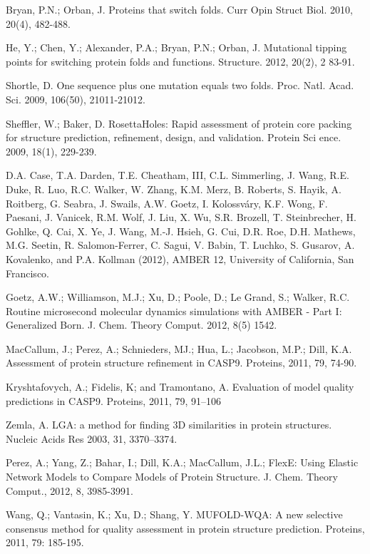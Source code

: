 \documentclass[12pt]{article}
\begin{document}
\begin{thebibliography}{99}
Bryan, P.N.; Orban, J. Proteins that switch folds. Curr Opin Struct Biol. 2010, 20(4), 482-488.

He, Y.; Chen, Y.; Alexander, P.A.; Bryan, P.N.; Orban, J. Mutational tipping points for switching protein folds and functions. Structure. 2012, 20(2), 2
83-91.

Shortle, D. One sequence plus one mutation equals two folds. Proc. Natl. Acad. Sci. 2009, 106(50), 21011-21012.

Sheffler, W.; Baker, D. RosettaHoles: Rapid assessment of protein core packing for structure prediction, refinement, design, and validation. Protein Sci
ence. 2009, 18(1), 229-239.

D.A. Case, T.A. Darden, T.E. Cheatham, III, C.L. Simmerling, J. Wang, R.E. Duke, R. Luo, R.C. Walker, W. Zhang, K.M. Merz, B. Roberts, S. Hayik, A. Roitberg, G. Seabra, J. Swails, A.W. Goetz, I. Kolossváry, K.F. Wong, F. Paesani, J. Vanicek, R.M. Wolf, J. Liu, X. Wu, S.R. Brozell, T. Steinbrecher, H. Gohlke, Q. Cai, X. Ye, J. Wang, M.-J. Hsieh, G. Cui, D.R. Roe, D.H. Mathews, M.G. Seetin, R. Salomon-Ferrer, C. Sagui, V. Babin, T. Luchko, S. Gusarov, A. Kovalenko, and P.A. Kollman (2012), AMBER 12, University of California, San Francisco.

Goetz, A.W.; Williamson, M.J.; Xu, D.; Poole, D.; Le Grand, S.; Walker, R.C. Routine microsecond molecular dynamics simulations with AMBER - Part I: Generalized
Born. J. Chem. Theory Comput. 2012, 8(5) 1542.

MacCallum, J.; Perez, A.; Schnieders, MJ.; Hua, L.; Jacobson, M.P.; Dill, K.A. Assessment of protein structure refinement
in CASP9. Proteins, 2011, 79, 74-90.

Kryshtafovych, A.; Fidelis, K; and Tramontano, A. Evaluation of model quality predictions in CASP9. Proteins, 2011, 79, 91–106

Zemla, A. LGA: a method for finding 3D similarities in protein structures. Nucleic Acids Res 2003, 31, 3370–3374.

Perez, A.; Yang, Z.; Bahar, I.; Dill, K.A.; MacCallum, J.L.; FlexE: Using Elastic Network Models to Compare Models of Protein Structure. J. Chem. Theory Comput., 2012, 8, 3985-3991.

Wang, Q.; Vantasin, K.; Xu, D.; Shang, Y. MUFOLD-WQA: A new selective consensus method for quality assessment in protein structure prediction.
Proteins, 2011, 79: 185-195.


\end{thebibliography}
\end{document}

